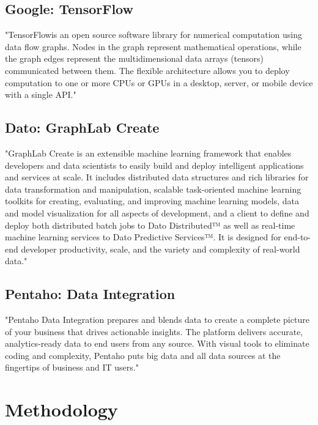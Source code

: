 \documentclass{article} %
\begin{document}
\subsection{Google: TensorFlow\texttrademark}

"TensorFlow\texttrademark is an open source software library for numerical computation using data flow graphs. Nodes in the graph represent mathematical operations, while the graph edges represent the multidimensional data arrays (tensors) communicated between them. The flexible architecture allows you to deploy computation to one or more CPUs or GPUs in a desktop, server, or mobile device with a single API." \cite{tensorflow}

\subsection{Dato: GraphLab Create}

"GraphLab Create is an extensible machine learning framework that enables developers and data scientists to easily build and deploy intelligent applications and services at scale. It includes distributed data structures and rich libraries for data transformation and manipulation, scalable task-oriented machine learning toolkits for creating, evaluating, and improving machine learning models, data and model visualization for all aspects of development, and a client to define and deploy both distributed batch jobs to Dato Distributed™ as well as real-time machine learning services to Dato Predictive Services™. It is designed for end-to-end developer productivity, scale, and the variety and complexity of real-world data." \cite{graphlabcreate}

\subsection{Pentaho: Data Integration}

"Pentaho Data Integration prepares and blends data to create a complete picture of your business that drives actionable insights. The platform delivers accurate, analytics-ready data to end users from any source. With visual tools to eliminate coding and complexity, Pentaho puts big data and all data sources at the fingertips of business and IT users." \cite{pentahodataintegration}

\section{Methodology}
\end{document}
